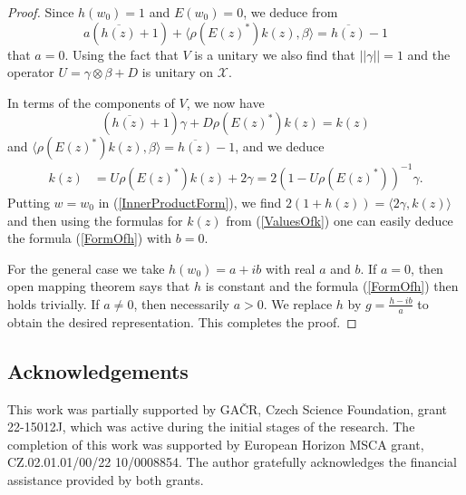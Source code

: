 \documentclass[12pt]{amsart}
\theoremstyle{definition}
\numberwithin{equation}{section}
\newcommand{\X}{\mathscr{X}}
\begin{document}
\begin{proof}
	Since $h(w_0)=1$ and $E(w_0)=0$, we deduce from $$a(\overline{h(z)}+1)+\langle \rho(E(z)^*)k(z),\beta\rangle=\overline{h(z)}-1$$ that $a=0$. Using the fact that $V$ is a unitary we also find that $||\gamma||=1$ and the operator $U=\gamma\otimes\beta+D$ is unitary on $\X$.
	
	In terms of the components of $V$, we now have $$(\overline{h(z)}+1)\gamma + D\rho(E(z)^*)k(z)=k(z)$$
	and $\langle\rho(E(z)^*)k(z),\beta\rangle=\overline{h(z)}-1$, and we deduce
	\begin{align}\label{ValuesOfk}
		k(z)&=U\rho(E(z)^*)k(z) +2\gamma=2(1-U\rho(E(z)^*))^{-1}\gamma.
	\end{align}
	Putting $w=w_0$ in (\ref{InnerProductForm}), we find $2(1+h(z))=\langle 2\gamma, k(z)\rangle$ and then using the formulas for $k(z)$ from (\ref{ValuesOfk}) one can easily deduce the formula (\ref{FormOfh}) with $b=0$.
	
	For the general case we take $h(w_0)=a+ib$ with real $a$ and $b$. If $a=0$, then open mapping theorem says that $h$ is constant and the formula (\ref{FormOfh}) then holds trivially. If $a\neq 0$, then necessarily $a>0$. We replace $h$ by $g=\frac{h-ib}{a}$ to obtain the desired representation. This completes the proof.
\end{proof}



\subsection*{Acknowledgements}
This work was partially supported by GAČR, Czech Science Foundation, grant 22-15012J, which was active during the initial stages of the research. The completion of this work was supported by European Horizon MSCA grant, CZ.02.01.01/00/22 10/0008854. The author gratefully acknowledges the financial assistance provided by both grants.



\normalsize
\end{document}
